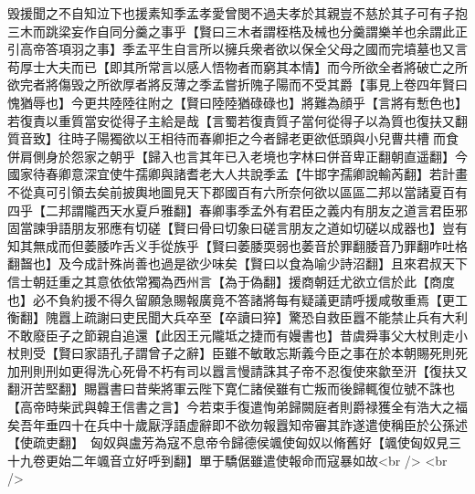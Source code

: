 毁援聞之不自知泣下也援素知季孟孝愛曾閔不過夫孝於其親豈不慈於其子可有子抱三木而跳梁妄作自同分羹之事乎【賢曰三木者謂桎梏及械也分羹謂樂羊也余謂此正引高帝答項羽之事】季孟平生自言所以擁兵衆者欲以保全父母之國而完墳墓也又言苟厚士大夫而已【即其所常言以感人悟物者而窮其本情】而今所欲全者將破亡之所欲完者將傷毁之所欲厚者將反薄之季孟嘗折隗子陽而不受其爵【事見上卷四年賢曰愧猶辱也】今更共陸陸往附之【賢曰陸陸猶碌碌也】將難為顔乎【言將有慙色也】若復責以重質當安從得子主給是哉【言蜀若復責質子當何從得子以為質也復扶又翻質音致】往時子陽獨欲以王相待而春卿拒之今者歸老更欲低頭與小兒曹共槽而食併肩側身於怨家之朝乎【歸入也言其年已入老境也字林曰併音卑正翻朝直遥翻】今國家待春卿意深宜使牛孺卿與諸耆老大人共說季孟【牛邯字孺卿說輸芮翻】若計畫不從真可引領去矣前披輿地圖見天下郡國百有六所奈何欲以區區二邦以當諸夏百有四乎【二邦謂隴西天水夏戶雅翻】春卿事季孟外有君臣之義内有朋友之道言君臣邪固當諫爭語朋友邪應有切磋【賢曰骨曰切象曰磋言朋友之道如切磋以成器也】豈有知其無成而但萎腇咋舌义手從族乎【賢曰萎腇耎弱也萎音於罪翻腇音乃罪翻咋吐格翻齧也】及今成計殊尚善也過是欲少味矣【賢曰以食為喻少詩沼翻】且來君叔天下信士朝廷重之其意依依常獨為西州言【為于偽翻】援商朝廷尤欲立信於此【商度也】必不負約援不得久留願急賜報廣竟不答諸將每有疑議更請呼援咸敬重焉【更工衡翻】隗囂上疏謝曰吏民聞大兵卒至【卒讀曰猝】驚恐自救臣囂不能禁止兵有大利不敢廢臣子之節親自追還【此因王元隴坻之捷而有嫚書也】昔虞舜事父大杖則走小杖則受【賢曰家語孔子謂曾子之辭】臣雖不敏敢忘斯義今臣之事在於本朝賜死則死加刑則刑如更得洗心死骨不朽有司以囂言慢請誅其子帝不忍復使來歙至汧【復扶又翻汧苦堅翻】賜囂書曰昔柴將軍云陛下寛仁諸侯雖有亡叛而後歸輒復位號不誅也【高帝時柴武與韓王信書之言】今若束手復遣恂弟歸闕庭者則爵禄獲全有浩大之福矣吾年垂四十在兵中十歲厭浮語虚辭即不欲勿報囂知帝審其詐遂遣使稱臣於公孫述【使疏吏翻】　匈奴與盧芳為寇不息帝令歸德侯颯使匈奴以脩舊好【颯使匈奴見三十九卷更始二年颯音立好呼到翻】單于驕倨雖遣使報命而寇暴如故<br />
<br />
